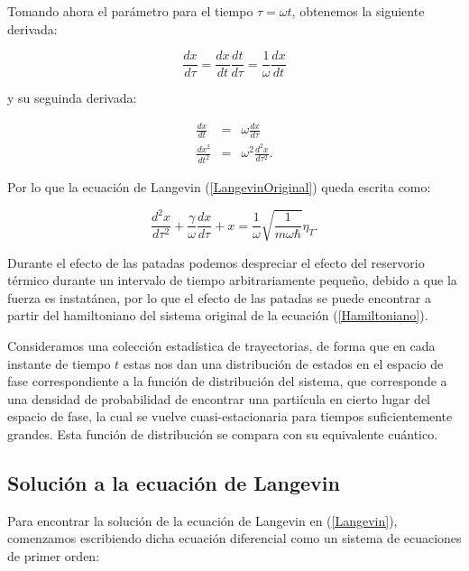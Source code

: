 \documentclass[letterpaper,12pt,oneside]{book}
\begin{document}
	Tomando ahora el par\'ametro para el tiempo $\tau=\omega t$, obtenemos la siguiente derivada:
	
	\begin{equation}
		\frac{dx}{d\tau} = \frac{dx}{dt}\frac{dt}{d\tau}
		= \frac{1}{\omega}\frac{dx}{dt}
	\end{equation}
	
	\noindent y su seguinda derivada:
	
	\begin{eqnarray}
	\frac{dx}{dt} & = & \omega\frac{dx}{d\tau} \nonumber\\ 
	\frac{dx^2}{dt^2} & = & \omega^2\frac{d^2 x}{d\tau^2}.
	\end{eqnarray}
	
	Por lo que la ecuaci\'on de Langevin (\ref{LangevinOriginal}) queda escrita como:
	
	\begin{equation}\label{Langevin}
		\frac{d^2x}{d\tau^2} + \frac{\gamma}{\omega}\frac{dx}{d\tau} + x = \frac{1}{\omega}\sqrt{\frac{1}{m\omega\hbar}}\eta_T.
	\end{equation} 
	
	Durante el efecto de las patadas podemos despreciar el efecto del reservorio t\'ermico durante un intervalo de tiempo arbitrariamente pequeño, debido a que la fuerza es instat\'anea, por lo que el efecto de las patadas se puede encontrar a partir del hamiltoniano del sistema original de la ecuaci\'on (\ref{Hamiltoniano}).
	
	
	Consideramos una colecci\'on estad\'istica de trayectorias, de forma que en cada instante de tiempo $t$ estas nos dan una distribuci\'on de estados en el espacio de fase correspondiente a la funci\'on de distribuci\'on del sistema, que corresponde a una densidad de probabilidad de encontrar una parti\'icula en cierto lugar del espacio de fase, la cual se vuelve cuasi-estacionaria para tiempos suficientemente grandes. Esta funci\'on de distribuci\'on se compara con su equivalente cu\'antico.
	
	\subsection{Soluci\'on a la ecuaci\'on de Langevin}
	
	Para encontrar la soluci\'on de la ecuaci\'on de Langevin en (\ref{Langevin}), comenzamos escribiendo dicha ecuaci\'on diferencial como un sistema de ecuaciones de primer orden:
	
\end{document}

